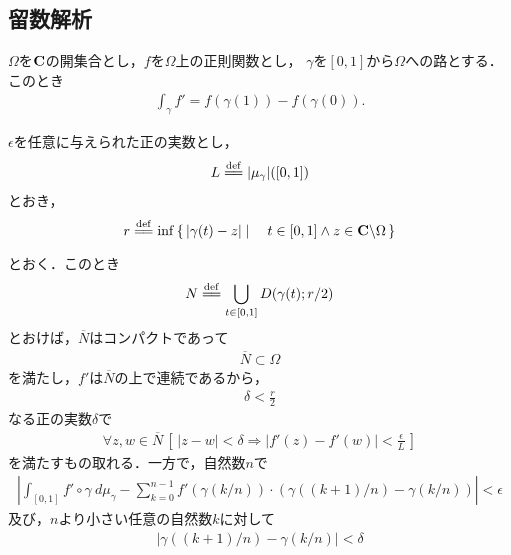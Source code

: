 \subsection{留数解析}
	
	\begin{screen}
		\begin{thm}[線積分の微分積分学の基本定理]
		\label{thm:fundamental_theorem_of_calculus_for_contour_integral}
			$\Omega$を$\mathbf{C}$の開集合とし，$f$を$\Omega$上の正則関数とし，
			$\gamma$を$[0,1]$から$\Omega$への路とする．このとき
			\begin{align}
				\int_{\gamma} f' = f(\gamma(1)) - f(\gamma(0)).
			\end{align}
		\end{thm}
	\end{screen}
	
	\begin{sketch}
		$\epsilon$を任意に与えられた正の実数とし，
		\begin{align}
			L \defeq |\mu_{\gamma}|([0,1])
		\end{align}
		とおき，
		\begin{align}
			r \defeq \inf{}{\Set{|\gamma(t) - z|}{t \in [0,1] \wedge z \in \C \backslash \Omega}}
		\end{align}
		とおく．このとき
		\begin{align}
			N \defeq \bigcup_{t \in [0,1]} \disc{\gamma(t)}{r/2}
		\end{align}
		とおけば，$\overline{N}$はコンパクトであって
		\begin{align}
			\overline{N} \subset \Omega
		\end{align}
		を満たし，$f'$は$\overline{N}$の上で連続であるから，
		\begin{align}
			\delta < \frac{r}{2}
		\end{align}
		なる正の実数$\delta$で
		\begin{align}
			\forall z,w \in \overline{N}\,
			\left[\, |z-w| < \delta \Longrightarrow |f'(z) - f'(w)| < \frac{\epsilon}{L}\, \right]
		\end{align}
		を満たすもの取れる．一方で，自然数$n$で
		\begin{align}
			\left|\int_{[0,1]} f' \circ \gamma\ d\mu_{\gamma}
			- \sum_{k=0}^{n-1} f'(\gamma(k/n)) \cdot \left(\gamma((k+1)/n) - \gamma(k/n)\right)\right|
			< \epsilon
		\end{align}
		及び，$n$より小さい任意の自然数$k$に対して
		\begin{align}
			|\gamma((k+1)/n) - \gamma(k/n)| < \delta
		\end{align}

\end{sketch}

